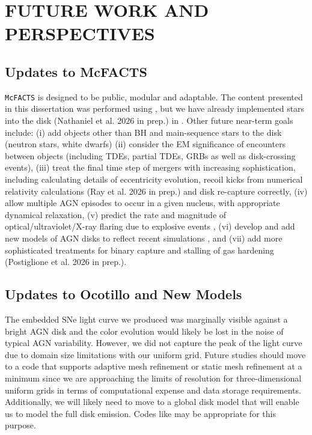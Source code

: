 \section{\texorpdfstring{\MakeUppercase{future work and perspectives}}{future work and perspectives}}
\label{sec:chapter-future}



\subsection{Updates to McFACTS}
\texttt{McFACTS} is designed to be public, modular and adaptable.
The content presented in this dissertation was performed using , but we have already implemented stars into the disk (Nathaniel et al. 2026 in prep.) in .
Other future near-term goals include:
(i) add objects other than BH and main-sequence stars to the disk (neutron stars, white dwarfs)
(ii) consider the EM significance of encounters between objects (including TDEs, partial TDEs, GRBs as well as disk-crossing events),
(iii) treat the final time step of mergers with increasing sophistication, including calculating details of eccentricity evolution, recoil kicks from numerical relativity calculations (Ray et al. 2026 in prep.) and disk re-capture correctly,
(iv) allow multiple AGN episodes to occur in a given nucleus, with appropriate dynamical relaxation, (v) predict the rate and magnitude of optical/ultraviolet/X-ray flaring due to explosive events \citep[mergers, disk-crossings, SNe, TDEs,][]{McPike+26-mcfactsIV},
(vi) develop and add new models of AGN disks to reflect recent simulations \citep{Hopkins+24}, and
(vii) add more sophisticated treatments for binary capture \citep{Whitehead+25b} and stalling of gas hardening (Postiglione et al. 2026 in prep.).

\subsection{Updates to Ocotillo and New Models}


The embedded SNe light curve we produced was marginally visible against a bright AGN disk and the color evolution would likely be lost in the noise of typical AGN variability. 
However, we did not capture the peak of the light curve due to domain size limitations with our uniform grid.
Future studies should move to a code that supports adaptive mesh refinement or static mesh refinement at a minimum since we are approaching the limits of resolution for three-dimensional uniform grids in terms of computational expense and data storage requirements.
Additionally, we will likely need to move to a global disk model that will enable us to model the full disk emission.
Codes like \citep[][]{Stone+20} may be appropriate for this purpose.

